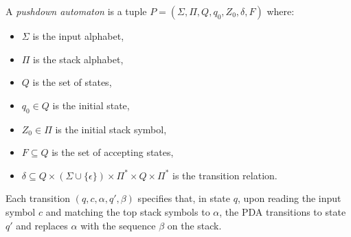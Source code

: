 \begin{definition}
    \label{def:PDA}
    \leanok

    A \emph{pushdown automaton} is a tuple $P = (\Sigma, \Pi, Q, q_0, Z_0, \delta, F)$ where:
    \begin{itemize}
        \item $\Sigma$ is the input alphabet,
        \item $\Pi$ is the stack alphabet,
        \item $Q$ is the set of states,
        \item $q_0 \in Q$ is the initial state,
        \item $Z_0 \in \Pi$ is the initial stack symbol,
        \item $F \subseteq Q$ is the set of accepting states,
        \item $\delta \subseteq Q \times (\Sigma \cup \{\epsilon\}) \times \Pi^* \times Q \times \Pi^*$ is the transition relation.
    \end{itemize}

    Each transition $(q, c, \alpha, q', \beta)$ specifies that, in state $q$, upon reading the input symbol $c$ and matching the top stack symbols to $\alpha$, the PDA transitions to state $q'$ and replaces $\alpha$ with the sequence $\beta$ on the stack.

\end{definition}
